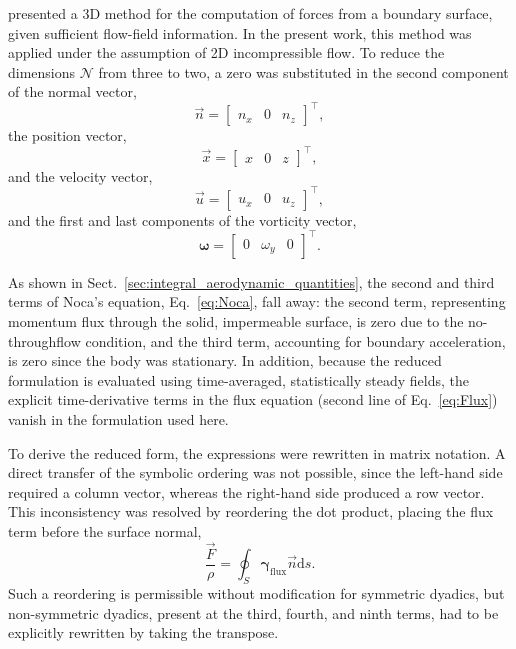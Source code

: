 \documentclass[wes, manuscript]{copernicus}
\begin{document}
% 
\cite{Noca1999} presented a 3D method for the computation of forces from a boundary surface, given sufficient flow-field information. In the present work, this method was applied under the assumption of 2D incompressible flow. To reduce the dimensions $\mathscr{N}$ from three to two, a zero was substituted in the second component of the normal vector,
\begin{equation}
\vec{n} = \begin{bmatrix} n_{{x}} & 0 & n_{z} \end{bmatrix}^{\top},
\end{equation}
the position vector,
\begin{equation}
\vec{x} = \begin{bmatrix} x & 0 & z \end{bmatrix}^{\top},
\end{equation}
and the velocity vector,
\begin{equation}
\vec{u} = \begin{bmatrix} u_{{x}} & 0 & u_{{z}} \end{bmatrix}^{\top},
\end{equation}
and the first and last components of the vorticity vector,
\begin{equation}
\boldsymbol{\omega} = \begin{bmatrix} 0 & \omega_{y} & 0 \end{bmatrix}^{\top}.
\end{equation}

As shown in Sect.~\ref{sec:integral_aerodynamic_quantities}, the second and third terms of Noca’s equation, Eq.~\eqref{eq:Noca}, fall away: the second term, representing momentum flux through the solid, impermeable surface, is zero due to the no-throughflow condition, and the third term, accounting for boundary acceleration, is zero since the body was stationary. In addition, because the reduced formulation is evaluated using time-averaged, statistically steady fields, the explicit time-derivative terms in the flux equation (second line of Eq.~\eqref{eq:Flux}) vanish in the formulation used here.


To derive the reduced form, the expressions were rewritten in matrix notation. A direct transfer of the symbolic ordering was not possible, since the left-hand side required a column vector, whereas the right-hand side produced a row vector. This inconsistency was resolved by reordering the dot product, placing the flux term before the surface normal,
\begin{equation}
 \frac{\vec{F}}{\rho} = \oint_{S} \boldsymbol{\gamma}_\textrm{flux} \vec{n}  \textrm{d}s .
\end{equation}
Such a reordering is permissible without modification for symmetric dyadics, but non-symmetric dyadics, present at the third, fourth, and ninth terms, had to be explicitly rewritten by taking the transpose.
\end{document}
